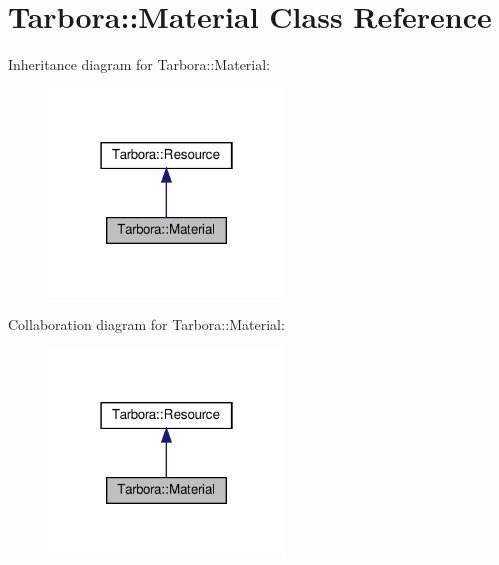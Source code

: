 \hypertarget{classTarbora_1_1Material}{}\section{Tarbora\+:\+:Material Class Reference}
\label{classTarbora_1_1Material}


Inheritance diagram for Tarbora\+:\+:Material\+:\nopagebreak
\begin{figure}[H]
\begin{center}
\leavevmode
\includegraphics[width=178pt]{classTarbora_1_1Material__inherit__graph}
\end{center}
\end{figure}


Collaboration diagram for Tarbora\+:\+:Material\+:\nopagebreak
\begin{figure}[H]
\begin{center}
\leavevmode
\includegraphics[width=178pt]{classTarbora_1_1Material__coll__graph}
\end{center}
\end{figure}
